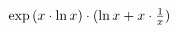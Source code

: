 \documentclass[12pt]{article}
\begin{document}
             
${{\exp {({x} \cdot {\ln {x}})}} \cdot {({\ln {x}} + {{x} \cdot {{1} \over {x}}})}}$
\end{document}
